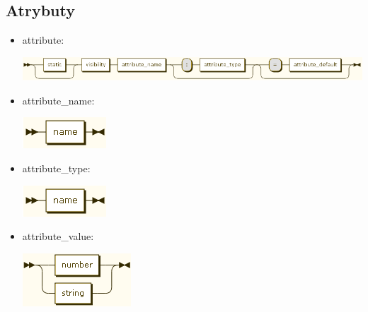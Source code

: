 \documentclass[a4paper,11pt,notitlepage]{article}
\begin{document}
\subsection{Atrybuty}
\begin{itemize}
\item attribute:

\includegraphics[scale=0.66]{images/grammar/attribute.png}

\item attribute\_name:

\includegraphics[scale=0.66]{images/grammar/name_xx.png}

\item attribute\_type:

\includegraphics[scale=0.66]{images/grammar/name_xx.png}

\item attribute\_value:

\includegraphics[scale=0.66]{images/grammar/attribute_value.png}
\end{itemize}
\end{document}
